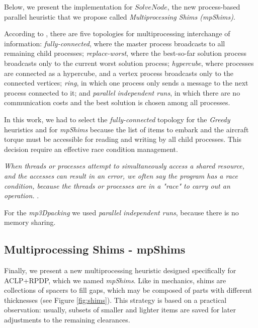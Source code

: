 \documentclass[preprint,authoryear]{elsarticle}
\begin{document}
Below, we present the implementation for $SolveNode$, the new process-based parallel heuristic that we propose called {\it Multiprocessing Shims (mpShims)}.

According to \cite[p.226]{manfrin2006}, there are five topologies for multiprocessing interchange of information: {\it fully-connected}, where the master process broadcasts to all remaining child processes; {\it replace-worst}, where the best-so-far solution process broadcasts only to the current worst solution process; {\it hypercube}, where processes are connected as a hypercube, and a vertex process broadcasts only to the connected vertices; {\it ring}, in which one process only sends a message to the next process connected to it; and {\it parallel independent runs}, in which there are no communication costs and the best solution is chosen among all processes.

In this work, we had to select the {\it fully-connected} topology for the {\it Greedy} heuristics and for {\it mpShims} because the list of items to embark and the aircraft torque must be accessible for reading and writing by all child processes. This decision require an effective race condition management.

{\it When threads or processes attempt to simultaneously access a shared resource, and the accesses can result in an error, we often say the program has a race condition, because the threads or processes are in a "race" to carry out an operation.} \cite[p. 53]{Pacheco:2020}.

For the {\it mp3Dpacking} we used {\it parallel independent runs}, because there is no memory sharing.


\subsection{Multiprocessing Shims - mpShims}


Finally, we present a new multiprocessing heuristic designed specifically for ACLP+RPDP, which we named \emph{mpShims}. Like in mechanics, shims are collections of spacers to fill gaps, which may be composed of parts with different thicknesses (see Figure \ref{fig:shims}). This strategy is based on a practical observation: usually, subsets of smaller and lighter items are saved for later adjustments to the remaining clearances.
\end{document}
